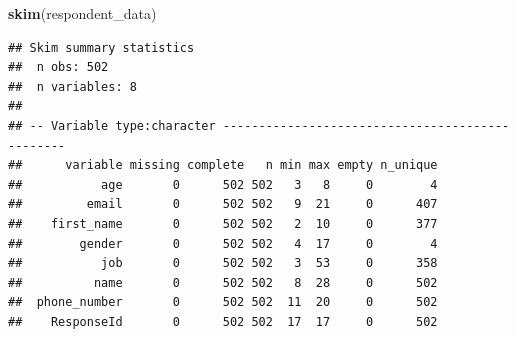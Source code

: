 \documentclass[]{book}
\newenvironment{Shaded}{\begin{snugshade}}{\end{snugshade}}
\newcommand{\KeywordTok}[1]{\textcolor[rgb]{0.13,0.29,0.53}{\textbf{#1}}}
\newcommand{\NormalTok}[1]{#1}
\begin{document}
\begin{Shaded}
\begin{Highlighting}[]
\KeywordTok{skim}\NormalTok{(respondent_data)}
\end{Highlighting}
\end{Shaded}

\begin{verbatim}
## Skim summary statistics
##  n obs: 502 
##  n variables: 8 
## 
## -- Variable type:character ------------------------------------------------
##      variable missing complete   n min max empty n_unique
##           age       0      502 502   3   8     0        4
##         email       0      502 502   9  21     0      407
##    first_name       0      502 502   2  10     0      377
##        gender       0      502 502   4  17     0        4
##           job       0      502 502   3  53     0      358
##          name       0      502 502   8  28     0      502
##  phone_number       0      502 502  11  20     0      502
##    ResponseId       0      502 502  17  17     0      502
\end{verbatim}


\end{document}
